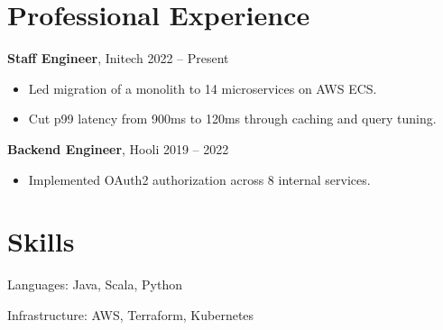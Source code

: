 \documentclass[11pt]{article}
\begin{document}
\section*{Professional Experience}
\textbf{Staff Engineer}, Initech \hfill 2022 -- Present
\begin{itemize}
  \item Led migration of a monolith to 14 microservices on AWS ECS.
  \item Cut p99 latency from 900ms to 120ms through caching and query tuning.
\end{itemize}

\textbf{Backend Engineer}, Hooli \hfill 2019 -- 2022
\begin{itemize}
  \item Implemented OAuth2 authorization across 8 internal services.
\end{itemize}

\section*{Skills}
Languages: Java, Scala, Python

Infrastructure: AWS, Terraform, Kubernetes
\end{document}
